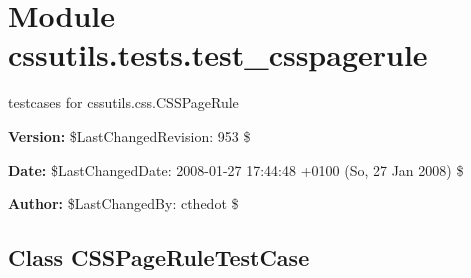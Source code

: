 %
%
%


\section{Module cssutils.tests.test\_csspagerule}

    \label{cssutils:tests:test_csspagerule}
testcases for cssutils.css.CSSPageRule

\textbf{Version:} \$LastChangedRevision: 953 \$



\textbf{Date:} \$LastChangedDate: 2008-01-27 17:44:48 +0100 (So, 27 Jan 2008) \$



\textbf{Author:} \$LastChangedBy: cthedot \$





\subsection{Class CSSPageRuleTestCase}

